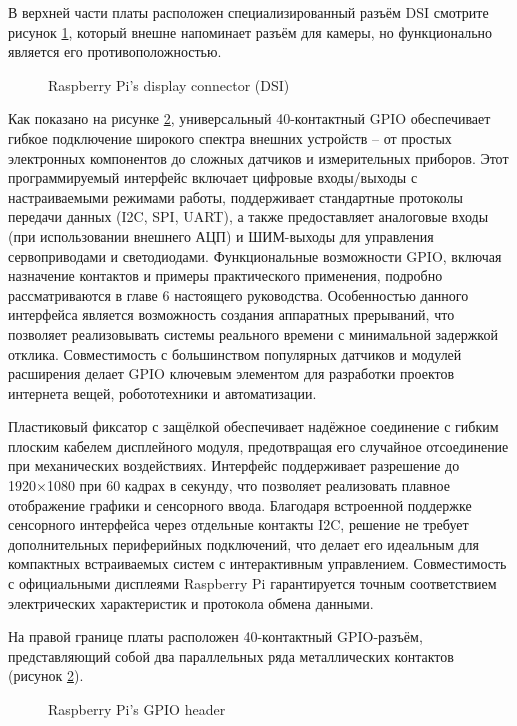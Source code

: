 В верхней части платы расположен специализированный разъём DSI смотрите рисунок \ref{fig:display}, который внешне напоминает разъём для камеры, но функционально является его противоположностью.

\begin{figure}[H]
	\centering
	\caption{Raspberry Pi’s display connector (DSI)}
	\label{fig:display}
\end{figure}

Как показано на рисунке \ref{fig:gpio}, универсальный 40-контактный GPIO обеспечивает гибкое подключение широкого спектра внешних устройств -- от простых электронных компонентов до сложных датчиков и измерительных приборов. Этот программируемый интерфейс включает цифровые входы/выходы с настраиваемыми режимами работы, поддерживает стандартные протоколы передачи данных (I2C, SPI, UART), а также предоставляет аналоговые входы (при использовании внешнего АЦП) и ШИМ-выходы для управления сервоприводами и светодиодами. Функциональные возможности GPIO, включая назначение контактов и примеры практического применения, подробно рассматриваются в главе 6 настоящего руководства. Особенностью данного интерфейса является возможность создания аппаратных прерываний, что позволяет реализовывать системы реального времени с минимальной задержкой отклика. Совместимость с большинством популярных датчиков и модулей расширения делает GPIO ключевым элементом для разработки проектов интернета вещей, робототехники и автоматизации.

Пластиковый фиксатор с защёлкой обеспечивает надёжное соединение с гибким плоским кабелем дисплейного модуля, предотвращая его случайное отсоединение при механических воздействиях. Интерфейс поддерживает разрешение до 1920×1080  при 60 кадрах в секунду, что позволяет реализовать плавное отображение графики и сенсорного ввода. Благодаря встроенной поддержке сенсорного интерфейса через отдельные контакты I2C, решение не требует дополнительных периферийных подключений, что делает его идеальным для компактных встраиваемых систем с интерактивным управлением. Совместимость с официальными дисплеями Raspberry Pi гарантируется точным соответствием электрических характеристик и протокола обмена данными.

На правой границе платы расположен 40-контактный GPIO-разъём, представляющий собой два параллельных ряда металлических контактов (рисунок \ref{fig:gpio}).

\begin{figure}[H]
	\centering
	\caption{Raspberry Pi’s GPIO header}
	\label{fig:gpio}
\end{figure}


